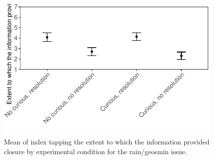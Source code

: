 \documentclass[
  letterpaper,
  DIV=11,
  numbers=noendperiod]{scrartcl}
\begin{document}
\begin{figure}

{\centering \includegraphics{curiosity_student-pilot_data-analysis_files/figure-pdf/fig-rclosure-1.pdf}

}

\caption{\label{fig-rclosure}Mean of index tapping the extent to which
the information provided closure by experimental condition for the
rain/geosmin issue.}

\end{figure}
\end{document}
